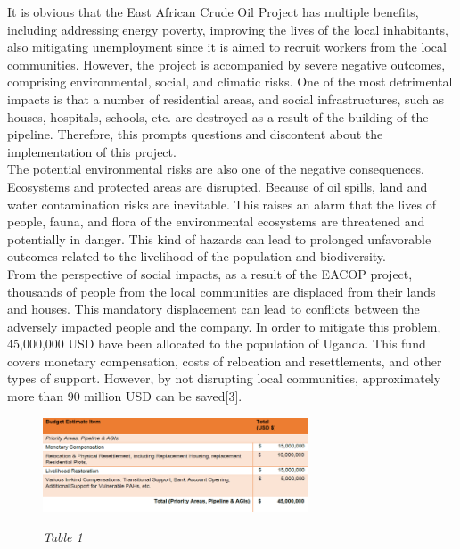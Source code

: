 \documentclass[12pt]{article}
\begin{document}
{\fontsize{12pt}{12pt}\selectfont  

\hspace*{1em}It is obvious that the East African Crude Oil Project has multiple benefits, including addressing energy poverty, improving the lives of the local inhabitants, also mitigating unemployment since it is aimed to recruit workers from the local communities. However, the project is accompanied by severe negative outcomes, comprising environmental, social, and climatic risks. One of the most detrimental impacts is that a number of residential areas, and social infrastructures, such as houses, hospitals, schools, etc. are destroyed as a result of the building of the pipeline. Therefore, this prompts questions and discontent about the implementation of this project.
\\

The potential environmental risks are also one of the negative consequences. Ecosystems and protected areas are disrupted. Because of oil spills, land and water contamination risks are inevitable. This raises an alarm that the lives of people, fauna, and flora of the environmental ecosystems are threatened and potentially in danger. This kind of hazards can lead to prolonged unfavorable outcomes related to the livelihood of the population and biodiversity.
\\

From the perspective of social impacts, as a result of the EACOP project, thousands of people from the local communities are displaced from their lands and houses. This mandatory displacement can lead to conflicts between the adversely impacted people and the company.  In order to mitigate this problem, 45,000,000 USD have been allocated to the population of Uganda. This fund covers monetary compensation, costs of relocation and resettlements, and other types of support. However, by not disrupting local communities, approximately more than 90 million USD can be saved[3].
\\


}


\begin{figure}[h!]
\begin{center}

	\centering
	\includegraphics[width=0.7\textwidth]{assets/images/table.png}
	
	\textit{Table 1}
\end{center}
	
\end{figure}
\end{document}
